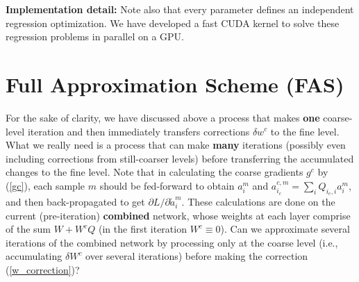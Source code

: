 \documentclass{article} %
\begin{document}
\textbf{Implementation detail:} Note also that every parameter defines an independent regression optimization. We have developed a fast CUDA kernel to solve these regression problems in parallel on a GPU.

\section{Full Approximation Scheme (FAS)}
\label{sec:fas}
For the sake of clarity, we have discussed above a process that makes \textbf{one} coarse-level iteration and then immediately transfers corrections $\delta w^c$ to the fine level. What we really need is a process that can make \textbf{many} iterations (possibly even including corrections from still-coarser levels) before transferring the accumulated changes to the fine level. Note that in calculating the coarse gradients $g^c$ by (\ref{gc}), each sample $m$ should be fed-forward to obtain $a^m_i$ and $a^{c,m}_{i_c} = \sum_i Q_{i_c,i} a^m_i$, and then back-propagated to get $\partial L/\partial \tilde{a}^m_i$. These calculations are done on the current (pre-iteration) \textbf{combined} network, whose weights at each layer comprise of the sum $W + W^c Q$ (in the first iteration $W^c \equiv 0$). Can we approximate several iterations of the combined network by processing only at the coarse level (i.e., accumulating $\delta W^c$ over several iterations) before making the correction (\ref{w_correction})?
\end{document}
